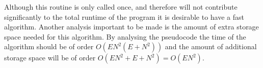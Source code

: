 Although this routine is only called once, and therefore will not contribute significantly 
to the total runtime of the program it is desirable to have a fast algorithm. Another analysis
important to be made is the amount of extra storage space needed for this algorithm.
By analysing the pseudocode the time of the algorithm should be of order $O(EN^2(E+N^2))$
and the amount of additional storage space will be of order $O(EN^2+E+N^2)=O(EN^2)$.

